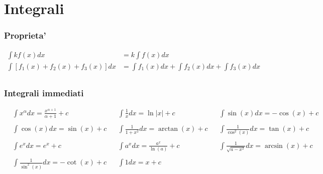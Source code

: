 \documentclass[a4paper]{article}
\begin{document}
	
	
	
	\newpage
	\section{Integrali}
	\subsubsection{Proprieta'}
	\begin{align*}
		\int k f(x) dx &= k \int f(x) dx\\
		\int \left[f_1(x)+f_2(x)+f_3(x)\right]dx &= \int f_1(x)dx + \int f_2(x)dx + \int f_3(x)dx\\
	\end{align*}
	
	\subsubsection{Integrali immediati}
	\begin{align*}
		&\int x^\alpha dx             = \frac{x^{\alpha + 1}}{\alpha + 1} +c & &\int \frac{1}{x}dx      = \ln|x| + c              &  &\int \sin (x) dx               = -\cos(x) + c    \\
		                            &                                        &  \\
		&\int \cos (x) dx             = \sin (x) +c                          & &\int \frac{1}{1+x^2}dx  = \arctan (x) +c          & &\int \frac{1}{\cos^2 (x)}dx    = \tan (x) + c    \\
		                            &                                        &  \\
		&\int e^x dx                  = e^x +c                               & &\int a^x dx             = \frac{a^x}{\ln (a)} + c & &\int \frac{1}{\sqrt{a-x^2}}dx  = \arcsin (x) + c \\
		                            &  \\
		&\int \frac{1}{\sin^2 (x)}dx  = -\cot(x) + c                         & &\int 1 dx               = x+c                     &\\
	\end{align*}
	
\end{document}
